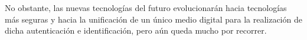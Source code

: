 \documentclass{manual}
\begin{document}
No obstante, las nuevas tecnologías del futuro evolucionarán hacia tecnologías más seguras y hacia la unificación de un único medio digital para la realización de dicha autenticación e identificación, pero aún queda mucho por recorrer. 



















\newpage
\nocite{*}
\printbibliography
%
%

%
%


\end{document}
